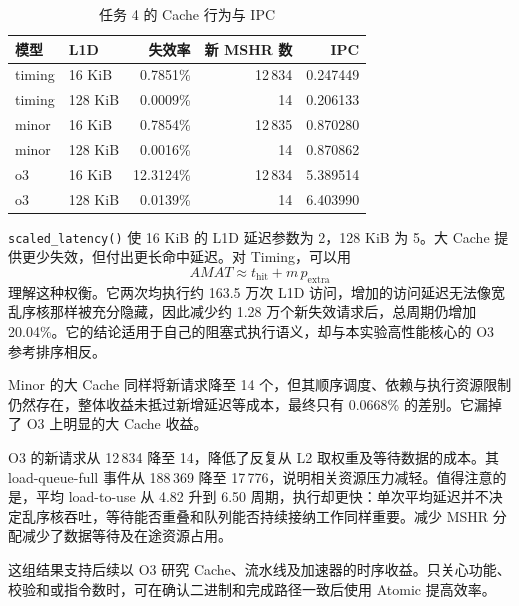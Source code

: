 \documentclass[12pt,a4paper,fontset=mac]{ctexart}
\begin{document}
\begin{table}[H]\centering\small
\caption{任务 4 的 Cache 行为与 IPC}\label{tab:fidmem}
\begin{tabular}{llrrr}\toprule
模型 & L1D & 失效率 & 新 MSHR 数 & IPC \\\midrule
timing & 16 KiB & 0.7851\% & 12\,834 & 0.247449 \\
timing & 128 KiB & 0.0009\% & 14 & 0.206133 \\
minor & 16 KiB & 0.7854\% & 12\,835 & 0.870280 \\
minor & 128 KiB & 0.0016\% & 14 & 0.870862 \\
o3 & 16 KiB & 12.3124\% & 12\,834 & 5.389514 \\
o3 & 128 KiB & 0.0139\% & 14 & 6.403990 \\
\bottomrule\end{tabular}\end{table}
\texttt{scaled\_latency()} 使 16 KiB 的 L1D 延迟参数为 2，128 KiB 为 5。大 Cache 提供更少失效，但付出更长命中延迟。对 Timing，可以用
\[
AMAT\approx t_{\mathrm{hit}}+m\,p_{\mathrm{extra}}
\]
理解这种权衡。它两次均执行约 163.5 万次 L1D 访问，增加的访问延迟无法像宽乱序核那样被充分隐藏，因此减少约 1.28 万个新失效请求后，总周期仍增加 20.04\%。它的结论适用于自己的阻塞式执行语义，却与本实验高性能核心的 O3 参考排序相反。

Minor 的大 Cache 同样将新请求降至 14 个，但其顺序调度、依赖与执行资源限制仍然存在，整体收益未抵过新增延迟等成本，最终只有 0.0668\% 的差别。它漏掉了 O3 上明显的大 Cache 收益。

O3 的新请求从 12\,834 降至 14，降低了反复从 L2 取权重及等待数据的成本。其 load-queue-full 事件从 188\,369 降至 17\,776，说明相关资源压力减轻。值得注意的是，平均 load-to-use 从 4.82 升到 6.50 周期，执行却更快：单次平均延迟并不决定乱序核吞吐，等待能否重叠和队列能否持续接纳工作同样重要。减少 MSHR 分配减少了数据等待及在途资源占用。

这组结果支持后续以 O3 研究 Cache、流水线及加速器的时序收益。只关心功能、校验和或指令数时，可在确认二进制和完成路径一致后使用 Atomic 提高效率。
\end{document}
